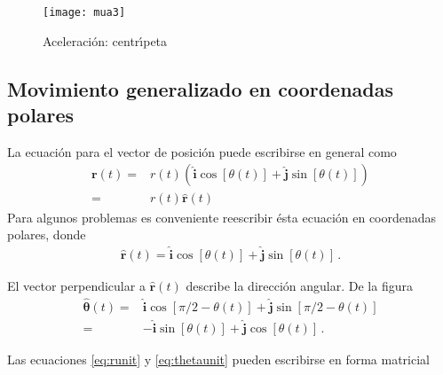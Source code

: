 \begin{frame}
  \begin{figure}
    \centering
    \texttt{[image: mua3]}
    \caption{Aceleraci\'on: centr\'\i peta}
    \label{fig:mua3}
  \end{figure}


\end{frame}

\subsection{Movimiento generalizado en coordenadas polares}


La ecuaci\'on para el vector de posici\'on puede escribirse en general como
\begin{align}
\label{eq:rpol}
  \mathbf{r}(t)=&r(t)\left(\hat{\mathbf{i}}\cos[\theta(t)]+\hat{\mathbf{j}}\sin[\theta(t)]\right)\nonumber\\
=&r(t)\hat{\mathbf{r}}(t)
\end{align}
Para algunos problemas es conveniente reescribir \'esta ecuaci\'on en coordenadas polares, donde
\begin{align}
\label{eq:runit}
  \hat{\mathbf{r}}(t)=\hat{\mathbf{i}}\cos[\theta(t)]+\hat{\mathbf{j}}\sin[\theta(t)]\,.
\end{align}


El vector perpendicular a $\hat{\mathbf{r}}(t)$ describe la dirección angular. De la figura %
\begin{align}
\label{eq:thetaunit}
  \hat{\boldsymbol{\theta}}(t)=&\hat{\mathbf{i}}\cos[\pi/2-\theta(t)]+\hat{\mathbf{j}}\sin[\pi/2-\theta(t)]\nonumber\\
=&-\hat{\mathbf{i}}\sin[\theta(t)]+\hat{\mathbf{j}}\cos[\theta(t)]\,.
\end{align}

Las ecuaciones \eqref{eq:runit} y \eqref{eq:thetaunit} pueden escribirse en forma matricial


